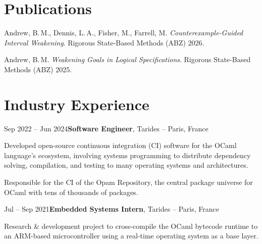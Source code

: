 \documentclass[10pt, letterpaper]{article}
\newcommand{\entryspacing}{0.20 cm}
\begin{document}
\section{Publications}

    \begin{onecolentry}
        \begin{highlights}
        \item Andrew, B.\,M., Dennis, L.\,A., Fisher, M., Farrell, M. \textit{Counterexample-Guided Interval Weakening}. Rigorous State-Based Methods (ABZ) 2026. 
        \end{highlights}
    \end{onecolentry}

    \vspace{\entryspacing}

    \begin{onecolentry}
        \begin{highlights}
        \item Andrew, B.\,M. \textit{Weakening Goals in Logical Specifications}. Rigorous State-Based Methods (ABZ) 2025. 
        \end{highlights}
    \end{onecolentry}

\section{Industry Experience}

    \begin{cventry}{Sep 2022 -- Jun 2024}{\textbf{Software Engineer}, Tarides -- Paris, France}
        \item Developed open-source continuous integration (CI) software for the OCaml language's ecosystem, involving systems programming to distribute dependency solving, compilation, and testing to many operating systems and architectures.
        \item Responsible for the CI of the Opam Repository, the central package universe for OCaml with tens of thousands of packages.
    \end{cventry}

    \vspace{\entryspacing}

    \begin{cventry}{Jul -- Sep 2021}{\textbf{Embedded Systems Intern}, Tarides -- Paris, France}
        \item Research \& development project to cross-compile the OCaml bytecode runtime to an ARM-based microcontroller using a real-time operating system as a base layer.
    \end{cventry}
\end{document}
